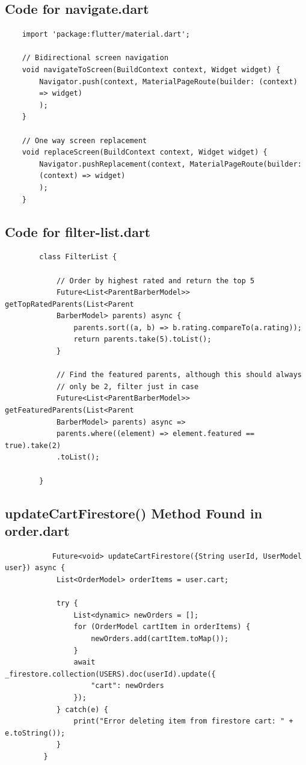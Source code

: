 \documentclass[12pt]{article}
\begin{document}
	\subsection{Code for navigate.dart}
	\label{code:navigate}
	\begin{verbatim}
	import 'package:flutter/material.dart';
	
	// Bidirectional screen navigation
	void navigateToScreen(BuildContext context, Widget widget) {
		Navigator.push(context, MaterialPageRoute(builder: (context) 
		=> widget)
		);
	}
	
	// One way screen replacement
	void replaceScreen(BuildContext context, Widget widget) {
		Navigator.pushReplacement(context, MaterialPageRoute(builder: 
		(context) => widget)
		);
	}	
	\end{verbatim}

	\subsection{Code for filter-list.dart}
	\label{code:filter-list}
	\begin{verbatim}
		class FilterList {
			
			// Order by highest rated and return the top 5
			Future<List<ParentBarberModel>> getTopRatedParents(List<Parent
			BarberModel> parents) async {
				parents.sort((a, b) => b.rating.compareTo(a.rating));
				return parents.take(5).toList();
			}
			
			// Find the featured parents, although this should always 
			// only be 2, filter just in case
			Future<List<ParentBarberModel>> getFeaturedParents(List<Parent
			BarberModel> parents) async =>
			parents.where((element) => element.featured == true).take(2)
			.toList();
			
		}
	\end{verbatim}

	\subsection{updateCartFirestore() Method Found in order.dart}
	\label{code:update-cart-item}
	\begin{verbatim}
		   Future<void> updateCartFirestore({String userId, UserModel user}) async {
		 	List<OrderModel> orderItems = user.cart;
		 	
		 	try {
		 		List<dynamic> newOrders = [];
		 		for (OrderModel cartItem in orderItems) {
		 			newOrders.add(cartItem.toMap());
		 		}
		 		await _firestore.collection(USERS).doc(userId).update({
		 			"cart": newOrders
		 		});
		 	} catch(e) {
		 		print("Error deleting item from firestore cart: " + e.toString());
		 	}
		 }
	\end{verbatim}
	
\end{document}
